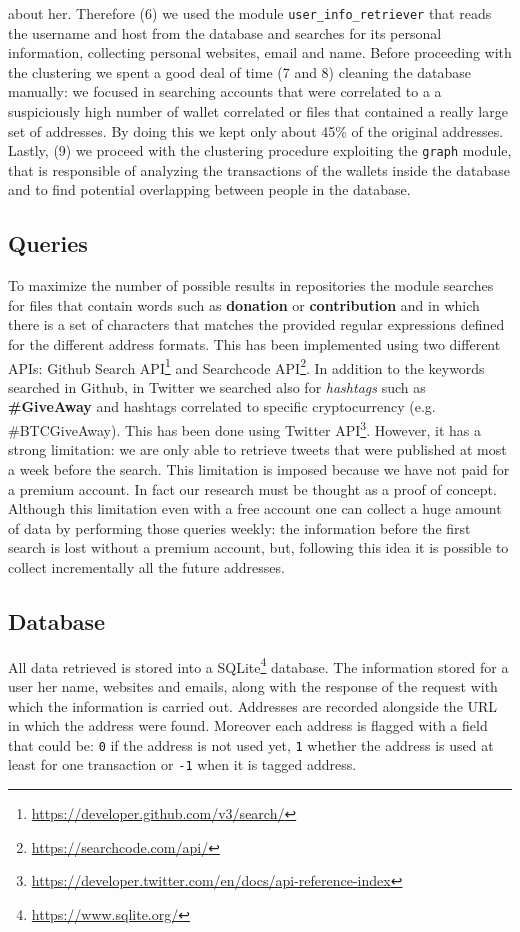 about her. Therefore (6) we used the module \verb|user_info_retriever| that
reads the username and host from the database and searches for its personal
information, collecting personal websites, email and name.
Before proceeding with the clustering we spent a good deal of time (7 and 8)
cleaning the database manually: we focused in searching accounts that were
correlated to a a suspiciously high number of wallet correlated or files that
contained a really large set of addresses. By doing this we kept only about 45\%
of the original addresses.
Lastly, (9) we proceed with the clustering procedure exploiting the \verb|graph|
module, that is responsible of analyzing the transactions of the wallets 
inside the database and to find potential overlapping between people in the
database.

\subsection{Queries}
\label{sec:queries}
To maximize the number of possible results in repositories the module
\walletcollector{} searches for files that contain words such as
\textbf{donation} or \textbf{contribution} and in which there is a set of
characters that matches the provided regular expressions defined for the
different address formats. This has been implemented using two different APIs:
Github Search API\footnote{\url{https://developer.github.com/v3/search/}} and
Searchcode API\footnote{\url{https://searchcode.com/api/}}.
In addition to the keywords searched in Github, in Twitter we searched also for
\textit{hashtags} such as \textbf{\#GiveAway} and
hashtags correlated to specific cryptocurrency (e.g. \#BTCGiveAway). This has
been done using Twitter
API\footnote{\url{https://developer.twitter.com/en/docs/api-reference-index}}.
However, it has a strong limitation: we are only able to retrieve tweets that
were published at most a week before the search. This limitation is imposed
because we have not paid for a premium account. In fact our research must be
thought as a proof of concept.
Although this limitation even with a free account one can collect a huge amount
of data by performing those queries weekly:
the information before the first search is lost without a premium account, but,
following this idea it is possible to collect incrementally all the future
addresses.

\subsection{Database}
All data retrieved is stored into a
SQLite\footnote{\url{https://www.sqlite.org/}} database. The information stored
for a user her name, websites and emails, along with the response of the request
with which the information is carried out. Addresses are recorded alongside the
URL in which the address were found. Moreover each address is flagged with a
field that could be: \texttt{0} if the address is not used yet, \texttt{1}
whether the address is used at least for one transaction or \texttt{-1} when it
is tagged address.